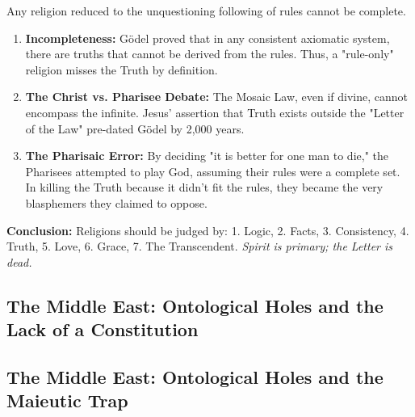 \documentclass[11pt,a4paper]{article}
\theoremstyle{definition}
\theoremstyle{remark}
\begin{document}
Any religion reduced to the unquestioning following of rules cannot be complete.
\begin{enumerate}
    \item \textbf{Incompleteness:} Gödel proved that in any consistent axiomatic system, there are truths that cannot be derived from the rules. Thus, a "rule-only" religion misses the Truth by definition.
    \item \textbf{The Christ vs. Pharisee Debate:} The Mosaic Law, even if divine, cannot encompass the infinite. Jesus’ assertion that Truth exists outside the "Letter of the Law" pre-dated Gödel by 2,000 years. 
    \item \textbf{The Pharisaic Error:} By deciding "it is better for one man to die," the Pharisees attempted to play God, assuming their rules were a complete set. In killing the Truth because it didn't fit the rules, they became the very blasphemers they claimed to oppose.
\end{enumerate}

\textbf{Conclusion:} Religions should be judged by: 1. Logic, 2. Facts, 3. Consistency, 4. Truth, 5. Love, 6. Grace, 7. The Transcendent. \textit{Spirit is primary; the Letter is dead.}


\subsection{The Middle East: Ontological Holes and the Lack of a Constitution}

\subsection{The Middle East: Ontological Holes and the Maieutic Trap}
\end{document}
